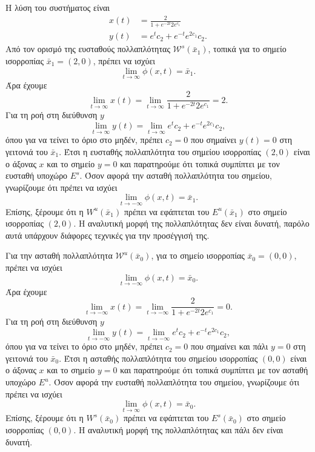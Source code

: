 \begin{solution}
    Η λύση του συστήματος είναι
    \begin{align*}
        x(t) &= \frac{2}{1 + e^{-2t}2e^{c_1}} \\
        y(t) &= e^{t}c_2 + e^{-t}e^{2c_1}c_2.
    \end{align*}
    Από τον ορισμό της ευσταθούς πολλαπλότητας \( \mathcal{W}^s(\bar{x}_1) \),
    τοπικά για το σημείο ισορροπίας \( \bar{x}_1 = (2, 0) \), πρέπει να ισχύει
    \[
        \lim_{t \to \infty} \phi(x, t) = \bar{x}_1.
    \]
    Άρα έχουμε
    \[
        \lim_{t \to \infty} x(t) =
        \lim_{t \to \infty} \frac{2}{1 + e^{-2t}2e^{c_1}} = 2.
    \]
    Για τη ροή στη διεύθυνση \( y \)
    \[
        \lim_{t \to \infty} y(t) =
        \lim_{t \to \infty} e^{t}c_2 + e^{-t}e^{2c_1}c_2,
    \]
    όπου για να τείνει το όριο στο μηδέν, πρέπει \( c_2 = 0 \) που σημαίνει
    \( y(t) = 0 \) στη γειτονιά του \( \bar{x}_1 \). Έτσι η ευσταθής
    πολλαπλότητα του σημείου ισορροπίας \( (2, 0) \) είναι ο άξονας \( x \) και
    το σημείο \( y = 0 \) και παρατηρούμε ότι τοπικά συμπίπτει με τον
    ευσταθή υποχώρο \( E^s \). Όσον αφορά την ασταθή πολλαπλότητα του σημείου,
    γνωρίζουμε ότι πρέπει να ισχύει
    \[
        \lim_{t \to -\infty} \phi(x, t) = \bar{x}_1.
    \]
    Επίσης, ξέρουμε ότι η \( W^u(\bar{x}_1) \) πρέπει να εφάπτεται του \(
    E^u(\bar{x}_1) \) στο σημείο ισορροπίας \( (2, 0) \). Η αναλυτική μορφή της
    πολλαπλότητας δεν είναι δυνατή, παρόλο αυτά υπάρχουν διάφορες τεχνικές για
    την προσέγγισή της.

    Για την ασταθή πολλαπλότητα \( \mathcal{W}^u(\bar{x}_0) \), για το σημείο
    ισορροπίας \( \bar{x}_0 = (0, 0) \), πρέπει να ισχύει
    \[
        \lim_{t \to -\infty} \phi(x, t) = \bar{x}_0.
    \]
    Άρα έχουμε
    \[
        \lim_{t \to -\infty} x(t) =
        \lim_{t \to -\infty} \frac{2}{1 + e^{-2t}2e^{c_1}} = 0.
    \]
    Για τη ροή στη διεύθυνση \( y \)
    \[
        \lim_{t \to -\infty} y(t) =
        \lim_{t \to -\infty} e^{t}c_2 + e^{-t}e^{2c_1}c_2,
    \]
    όπου για να τείνει το όριο στο μηδέν, πρέπει \( c_2 = 0 \) που σημαίνει και
    πάλι \( y = 0 \) στη γειτονιά του \( \bar{x}_0 \). Έτσι η ασταθής πολλαπλότητα
    του σημείου ισορροπίας \( (0, 0) \) είναι ο άξονας \( x \) και το σημείο
    \( y = 0 \) και παρατηρούμε ότι τοπικά συμπίπτει με τον ασταθή υποχώρο
    \( E^u \). Όσον αφορά την ευσταθή πολλαπλότητα του σημείου, γνωρίζουμε ότι
    πρέπει να ισχύει
    \[
        \lim_{t \to \infty} \phi(x, t) = \bar{x}_0.
    \]
    Επίσης, ξέρουμε ότι η \( W^s(\bar{x}_0) \) πρέπει να εφάπτεται του \(
    E^s(\bar{x}_0) \) στο σημείο ισορροπίας \( (0, 0) \). Η αναλυτική μορφή της
    πολλαπλότητας και πάλι δεν είναι δυνατή.


\end{solution}
